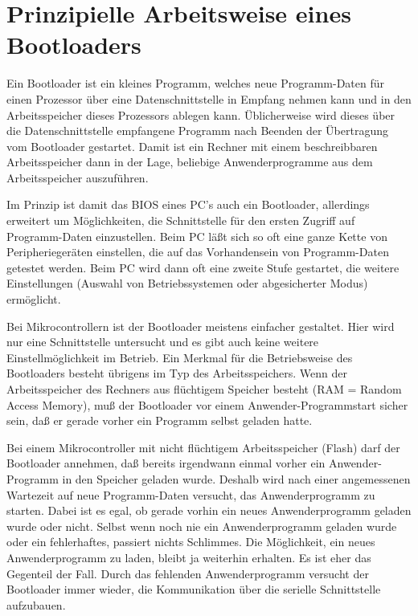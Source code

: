 \chapter{Prinzipielle Arbeitsweise eines Bootloaders}

Ein Bootloader ist ein kleines Programm, welches neue Programm-Daten
für einen Prozessor über eine Datenschnittstelle in Empfang nehmen kann
und in den Arbeitsspeicher dieses Prozessors ablegen kann.
Üblicherweise wird dieses über die Datenschnittstelle empfangene
Programm nach Beenden der Übertragung vom Bootloader gestartet.
Damit ist ein Rechner mit einem beschreibbaren Arbeitsspeicher
dann in der Lage, beliebige Anwenderprogramme aus dem
Arbeitsspeicher auszuführen.


Im Prinzip ist damit das BIOS eines PC's auch ein Bootloader,
allerdings erweitert um Möglichkeiten, die Schnittstelle
für den ersten Zugriff auf Programm-Daten einzustellen.
Beim PC läßt sich so oft eine ganze Kette von Peripheriegeräten
einstellen, die auf das Vorhandensein von Programm-Daten
getestet werden. 
Beim PC wird dann oft eine zweite Stufe gestartet, die weitere
Einstellungen (Auswahl von Betriebssystemen oder abgesicherter
Modus) ermöglicht.


Bei Mikrocontrollern ist der Bootloader meistens einfacher gestaltet.
Hier wird nur eine Schnittstelle untersucht und es gibt auch keine
weitere Einstellmöglichkeit im Betrieb.
Ein Merkmal für die Betriebsweise des Bootloaders besteht übrigens
im Typ des Arbeitsspeichers. Wenn der Arbeitsspeicher des Rechners
aus flüchtigem Speicher besteht (RAM = Random Access Memory), muß
der Bootloader vor einem Anwender-Programmstart sicher sein,
daß er gerade vorher ein Programm selbst geladen hatte.

Bei einem Mikrocontroller mit nicht flüchtigem Arbeitsspeicher (Flash)
darf der Bootloader annehmen, daß bereits irgendwann einmal
vorher ein Anwender-Programm in den Speicher geladen wurde.
Deshalb wird nach einer angemessenen Wartezeit auf neue Programm-Daten
versucht, das Anwenderprogramm zu starten. Dabei ist es egal,
ob gerade vorhin ein neues Anwenderprogramm geladen wurde oder nicht.
Selbst wenn noch nie ein Anwenderprogramm geladen wurde oder ein
fehlerhaftes, passiert nichts Schlimmes. Die Möglichkeit, ein
neues Anwenderprogramm zu laden, bleibt ja weiterhin erhalten.
Es ist eher das Gegenteil der Fall. Durch das fehlenden Anwenderprogramm
versucht der Bootloader immer wieder, die Kommunikation über
die serielle Schnittstelle aufzubauen.

